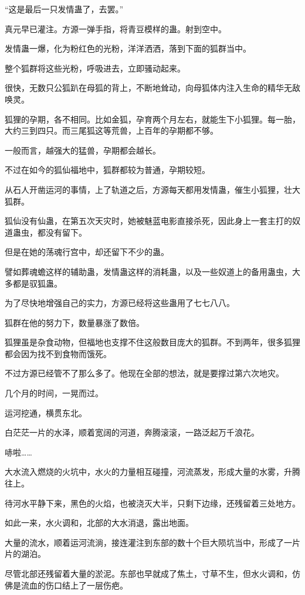 \begin{this_body}
“这是最后一只发情蛊了，去罢。”

真元早已灌注。方源一弹手指，将青豆模样的蛊。射到空中。

发情蛊一爆，化为粉红色的光粉，洋洋洒洒，落到下面的狐群当中。

整个狐群将这些光粉，呼吸进去，立即骚动起来。

很快，无数只公狐趴在母狐的背上，不断地耸动，向母狐体内注入生命的精华无敌唤灵。

狐狸的孕期，各不相同。比如金狐，孕育两个月左右，就能生下小狐狸。每一胎，大约三到四只。而三尾狐这等荒兽，上百年的孕期都不够。

一般而言，越强大的猛兽，孕期都会越长。

不过在如今的狐仙福地中，狐群都较为普通，孕期较短。

从石人开凿运河的事情，上了轨道之后，方源每天都用发情蛊，催生小狐狸，壮大狐群。

狐仙没有仙蛊，在第五次天灾时，她被魅蓝电影直接杀死，因此身上一套主打的奴道蛊虫，都没有留下。

但是在她的荡魂行宫中，却还留下不少的蛊。

譬如葬魂蟾这样的辅助蛊，发情蛊这样的消耗蛊，以及一些奴道上的备用蛊虫，大多都是驭狐蛊。

为了尽快地增强自己的实力，方源已经将这些蛊用了七七八八。

狐群在他的努力下，数量暴涨了数倍。

狐狸虽是杂食动物，但福地也支撑不住这般数目庞大的狐群。不到两年，很多狐狸都会因为找不到食物而饿死。

不过方源已经管不了那么多了。他现在全部的想法，就是要撑过第六次地灾。

几个月的时间，一晃而过。

运河挖通，横贯东北。

白茫茫一片的水泽，顺着宽阔的河道，奔腾滚滚，一路泛起万千浪花。

哧啦……

大水流入燃烧的火坑中，水火的力量相互碰撞，河流蒸发，形成大量的水雾，升腾往上。

待河水平静下来，黑色的火焰，也被浇灭大半，只剩下边缘，还残留着三处地方。

如此一来，水火调和，北部的大水消退，露出地面。

大量的流水，顺着运河流淌，接连灌注到东部的数十个巨大陨坑当中，形成了一片片的湖泊。

尽管北部还残留着大量的淤泥。东部也早就成了焦土，寸草不生，但水火调和，仿佛是流血的伤口结上了一层伤疤。


\end{this_body}
